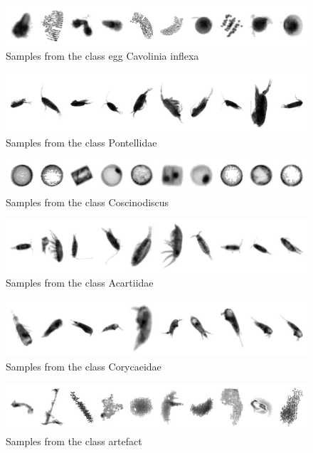 \begin{figure}[h]
\includegraphics[width=\columnwidth]{collage/055_egg__Cavolinia_inflexa.jpg}\caption{Samples from the class egg  Cavolinia inflexa }
\end{figure}
\begin{figure}[h]
\includegraphics[width=\columnwidth]{collage/056_Pontellidae.jpg}\caption{Samples from the class Pontellidae }
\end{figure}
\begin{figure}[h]
\includegraphics[width=\columnwidth]{collage/057_Coscinodiscus.jpg}\caption{Samples from the class Coscinodiscus }
\end{figure}
\begin{figure}[h]
\includegraphics[width=\columnwidth]{collage/058_Acartiidae.jpg}\caption{Samples from the class Acartiidae }
\end{figure}
\begin{figure}[h]
\includegraphics[width=\columnwidth]{collage/059_Corycaeidae.jpg}\caption{Samples from the class Corycaeidae }
\end{figure}
\begin{figure}[h]
\includegraphics[width=\columnwidth]{collage/060_artefact.jpg}\caption{Samples from the class artefact }
\end{figure}
